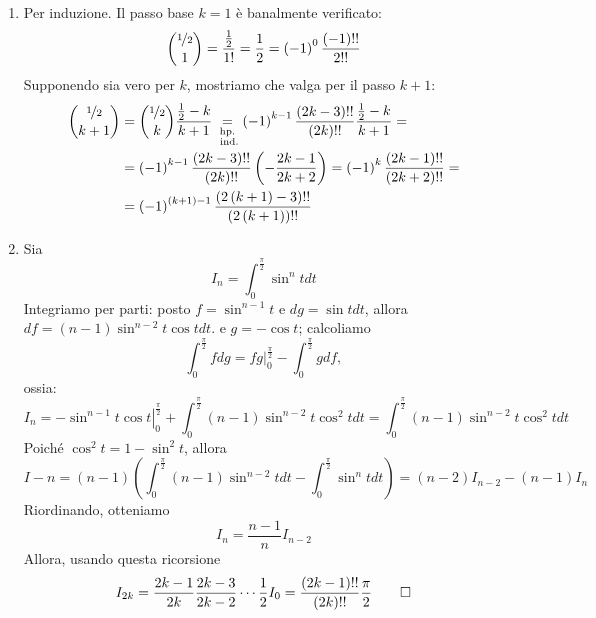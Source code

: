 \begin{demonstration}~
	\begin{enumerate}[label=\Roman*]
		\item Per induzione. Il passo base $k=1$ è banalmente verificato:
		\begin{equation*}
			\binom{\nicefrac{1}{2}}{1}=\frac{\frac{1}{2}}{1!}=\frac{1}{2}=\left(-1\right)^0\frac{\left(-1\right)!!}{2!!}
		\end{equation*}
	Supponendo sia vero per $k$, mostriamo che valga per il passo $k+1$:
	\begin{align*}
		\binom{\nicefrac{1}{2}}{k+1}&=\binom{\nicefrac{1}{2}}{k}\frac{\frac{1}{2}-k}{k+1}\underset{\substack{\text{hp.}\\\text{ ind.}}}{=}\left(-1\right)^{k-1}\frac{\left(2k-3\right)!!}{\left(2k\right)!!}\frac{\frac{1}{2}-k}{k+1}=\\
		&=\left(-1\right)^{k-1}\frac{\left(2k-3\right)!!}{\left(2k\right)!!}\left(-\frac{2k-1}{2k+2}\right)=\left(-1\right)^{k}\frac{\left(2k-1\right)!!}{\left(2k+2\right)!!}=\\
		&=\left(-1\right)^{\left(k+1\right)-1}\frac{\left(2\left(k+1\right)-3\right)!!}{\left(2\left(k+1\right)\right)!!}
	\end{align*}
	\item Sia
	\begin{equation*}
		I_n=\int_{0}^{\frac{\pi}{2}}\sin^ntdt
	\end{equation*}
	Integriamo per parti: posto $f=\sin^{n-1}t$ e $dg=\sin tdt$, allora $df=\left(n-1\right)\sin^{n-2}t\cos tdt$. e $g=-\cos t$; calcoliamo
	\begin{equation*}
		\int_{0}^{\frac{\pi}{2}}fdg=\left.fg\right\vert_{0}^{\frac{\pi}{2}}-\int_{0}^{\frac{\pi}{2}}gdf,
	\end{equation*}
	ossia:
	\begin{equation*}
		I_n=\left.-\sin^{n-1}t\cos t\right\vert_{0}^{\frac{\pi}{2}}+\int_{0}^{\frac{\pi}{2}}\left(n-1\right)\sin^{n-2}t\cos^2 tdt=\int_{0}^{\frac{\pi}{2}}\left(n-1\right)\sin^{n-2}t\cos^2 tdt
	\end{equation*}
	Poiché $\cos^2t=1-\sin^2t$, allora
	\begin{equation*}
		I-n=\left(n-1\right)\left(\int_{0}^{\frac{\pi}{2}}\left(n-1\right)\sin^{n-2}tdt-\int_{0}^{\frac{\pi}{2}}\sin^{n}tdt\right)=\left(n-2\right)I_{n-2}-\left(n-1\right)I_n
	\end{equation*}
	Riordinando, otteniamo
	\begin{equation*}
		I_n=\frac{n-1}{n}I_{n-2}
	\end{equation*}
	Allora, usando questa ricorsione
	\begin{equation*}
		I_{2k}=\frac{2k-1}{2k}\frac{2k-3}{2k-2}\cdots\frac{1}{2}I_0=\frac{\left(2k-1\right)!!}{\left(2k\right)!!}\frac{\pi}{2}\qedhere
	\end{equation*}
	\end{enumerate}
\end{demonstration}
